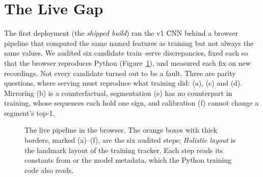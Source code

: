 \section{The Live Gap}
\label{sec:livegap}

The first deployment (the \emph{shipped build}) ran the v1 CNN behind a browser pipeline that
computed the same named features as training but not always the same values. We audited six
candidate train--serve discrepancies, fixed each so that the browser reproduces Python
(Figure~\ref{fig:pipeline}), and measured each fix on new recordings. Not every candidate turned
out to be a fault. Three are parity questions, where serving must reproduce what training did:
(a), (c) and (d). Mirroring (b) is a counterfactual, segmentation (e) has no counterpart in
training, whose sequences each hold one sign, and calibration (f) cannot change a segment's top-1.

\begin{figure}[t]
\centering
{}
\caption{The live pipeline in the browser. The orange boxes with thick borders, marked (a)--(f),
are the six audited steps; \emph{Holistic layout} is the landmark layout of the training tracker.
Each step reads its constants from  or the model metadata, which the
Python training code also reads.}
\label{fig:pipeline}
\end{figure}

